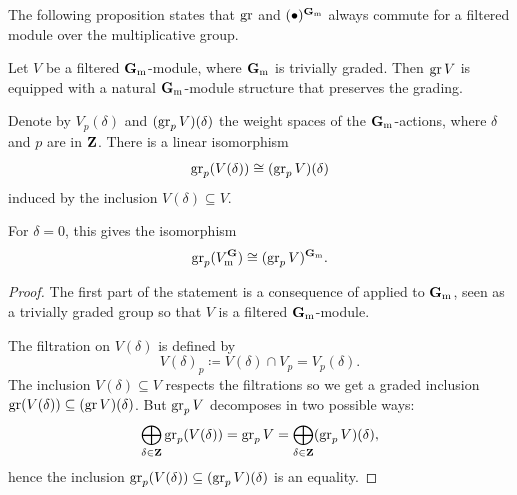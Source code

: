 The following proposition states that $\operatorname{gr}$ and $(\bullet)^{\mathbf{G}_\mathrm{m}}$ always commute for a filtered module over the multiplicative group.

\begin{proposition} \label{proposition:weight-filtration}
	Let $V$ be a filtered $\mathbf{G}_\mathrm{m}$-module, where $\mathbf{G}_\mathrm{m}$ is trivially graded. Then $\operatorname{gr} V$ is equipped with a natural $\mathbf{G}_\mathrm{m}$-module structure that preserves the grading. 
	
	Denote by $V_p(\delta)$ and $(\operatorname{gr}_p V)(\delta)$ the weight spaces of the $\mathbf{G}_\mathrm{m}$-actions, where $\delta$ and $p$ are in $\mathbf{Z}$. There is a linear isomorphism
	$$ \operatorname{gr}_p(V(\delta)) \cong (\operatorname{gr}_p V)(\delta) $$
	induced by the inclusion $V(\delta) \subseteq V$.
	
	For $\delta = 0$, this gives the isomorphism
	\[ \operatorname{gr}_p(V^\mathbf{G}_\mathrm{m}) \cong (\operatorname{gr}_p V)^{\mathbf{G}_\mathrm{m}}.  \]
\end{proposition}

\begin{proof}
	The first part of the statement is a consequence of  applied to $\mathbf{G}_\mathrm{m}$, seen as a trivially graded group so that $V$ is a filtered $\mathbf{G}_\mathrm{m}$-module. 
	
	The filtration on $V(\delta)$ is defined by
	$$ V(\delta)_p \coloneqq V(\delta) \cap V_p = V_p(\delta). $$
	The inclusion $V(\delta) \subseteq V$ respects the filtrations so we get a graded inclusion~$\operatorname{gr} (V(\delta)) \subseteq (\operatorname{gr} V) (\delta)$. But $\operatorname{gr}_p V$ decomposes in two possible ways:
	$$ \bigoplus_{\delta \in \mathbf{Z}} \operatorname{gr}_p (V(\delta)) = \operatorname{gr}_p V = \bigoplus_{\delta \in \mathbf{Z}}  (\operatorname{gr}_p V) (\delta), $$
	hence the  inclusion $\operatorname{gr}_p (V(\delta)) \subseteq (\operatorname{gr}_p V) (\delta)$ is an equality. 
\end{proof}

